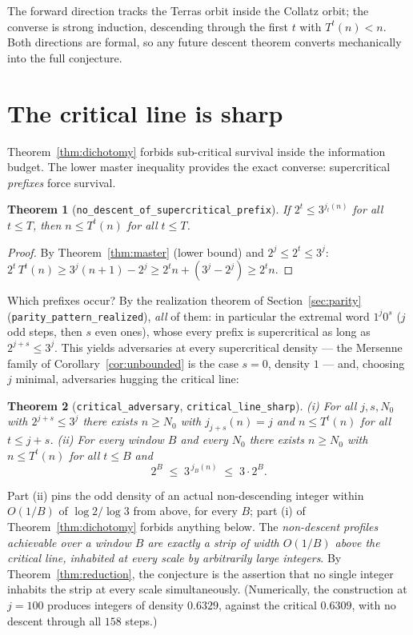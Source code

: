 \documentclass[11pt]{article}
\newtheorem{theorem}{Theorem}[section]
\newcommand{\code}[1]{\texttt{#1}}
\newcommand{\jodd}[2]{j_{#1}(#2)}
\begin{document}
The forward direction tracks the Terras orbit inside the Collatz orbit;
the converse is strong induction, descending through the first
$t$ with $T^t(n) < n$. Both directions are formal, so any future
descent theorem converts mechanically into the full conjecture.

\section{The critical line is sharp}\label{sec:critical}

Theorem~\ref{thm:dichotomy} forbids sub-critical survival inside the
information budget. The lower master inequality provides the exact
converse: supercritical \emph{prefixes} force survival.

\begin{theorem}[\code{no\_descent\_of\_supercritical\_prefix}]
\label{thm:prefix}
If $2^t \le 3^{\jodd{t}{n}}$ for all $t \le T$, then
$n \le T^t(n)$ for all $t \le T$.
\end{theorem}

\begin{proof}
By Theorem~\ref{thm:master} (lower bound) and $2^{j} \le 2^t \le 3^j$:
$2^t\,T^t(n) \ge 3^j(n+1) - 2^j \ge 2^t n + (3^j - 2^j) \ge 2^t n$.
\end{proof}

Which prefixes occur? By the realization theorem of
Section~\ref{sec:parity} (\code{parity\_pattern\_realized}), \emph{all}
of them: in particular the extremal word $1^j 0^s$ ($j$ odd steps, then
$s$ even ones), whose every prefix is supercritical as long as
$2^{j+s} \le 3^j$. This yields adversaries at every supercritical
density --- the Mersenne family of Corollary~\ref{cor:unbounded} is the
case $s = 0$, density $1$ --- and, choosing $j$ minimal, adversaries
hugging the critical line:

\begin{theorem}[\code{critical\_adversary}, \code{critical\_line\_sharp}]
\label{thm:sharp}
\emph{(i)} For all $j, s, N_0$ with $2^{j+s} \le 3^j$ there exists
$n \ge N_0$ with $\jodd{j+s}{n} = j$ and $n \le T^t(n)$ for all
$t \le j+s$.
\emph{(ii)} For every window $B$ and every $N_0$ there exists
$n \ge N_0$ with $n \le T^t(n)$ for all $t \le B$ and
\[
2^B \;\le\; 3^{\,\jodd{B}{n}} \;\le\; 3 \cdot 2^B .
\]
\end{theorem}

Part (ii) pins the odd density of an actual non-descending integer
within $O(1/B)$ of $\log 2/\log 3$ from above, for every $B$; part (i)
of Theorem~\ref{thm:dichotomy} forbids anything below. The
\emph{non-descent profiles achievable over a window $B$ are exactly a
strip of width $O(1/B)$ above the critical line, inhabited at every
scale by arbitrarily large integers}. By Theorem~\ref{thm:reduction},
the conjecture is the assertion that no single integer inhabits the
strip at every scale simultaneously. (Numerically, the construction at
$j = 100$ produces integers of density $0.6329$, against the critical
$0.6309$, with no descent through all $158$ steps.)
\end{document}
